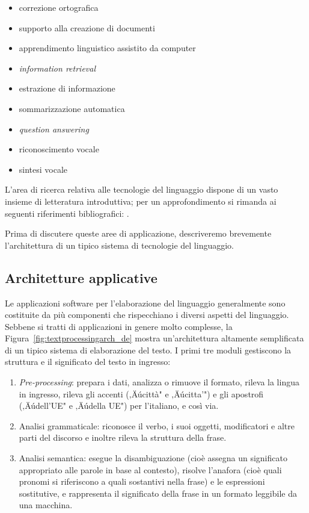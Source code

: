 \begin{multicols}{2}
\begin{itemize}
\item correzione ortografica
\item supporto alla creazione di documenti
\item apprendimento linguistico assistito da computer
\item \emph{information retrieval}
\item estrazione di informazione
\item sommarizzazione automatica
\item \emph{question answering}
\item riconoscimento vocale 
\item sintesi vocale
\end{itemize}

L'area di ricerca relativa alle tecnologie del linguaggio dispone
di un vasto insieme di letteratura introduttiva; per un approfondimento 
si rimanda ai seguenti riferimenti bibliografici:  
\cite{carstensen-etal1, jurafsky-martin01, manning-schuetze1,  lt-world1, lt-survey1}.

Prima di discutere queste aree di applicazione, descriveremo brevemente
l'architettura di un tipico sistema di tecnologie del linguaggio.

\subsection{Architetture applicative}

Le applicazioni software per l'elaborazione del linguaggio generalmente sono
costituite da pi\`{u} componenti che rispecchiano i diversi aspetti del
linguaggio. Sebbene si tratti di applicazioni in genere molto complesse, la 
Figura~\ref{fig:textprocessingarch_de} mostra un'architettura altamente 
semplificata di un tipico sistema di elaborazione del testo. I primi tre
moduli gestiscono la struttura e il significato del testo in ingresso:

\begin{enumerate}
\item \emph{Pre-processing}: prepara i dati, analizza o rimuove il formato, rileva la lingua in ingresso, rileva gli accenti (‚Äúcitt\`{a}" e ‚Äúcitta'") e gli apostrofi (‚Äúdell'UE" e ‚Äúdella UE") per l'italiano, e cos\`{i} via.
\item Analisi grammaticale: riconosce il verbo, i suoi oggetti, modificatori e altre parti del discorso e inoltre rileva la struttura della frase.
\item Analisi semantica: esegue la disambiguazione (cio\`{e} assegna un significato appropriato alle parole in base al contesto), risolve l'anafora (cio\`{e} quali pronomi si riferiscono a quali sostantivi nella frase) e le espressioni sostitutive, e rappresenta il significato della frase in un formato leggibile da una macchina.
\end{enumerate}


\end{multicols}
